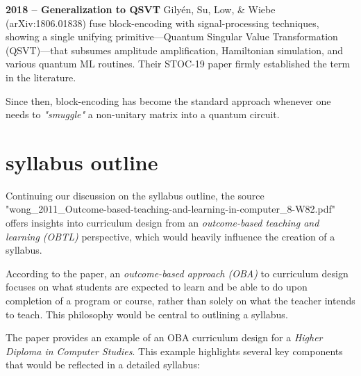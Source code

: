 \documentclass[11pt,a4paper]{article}
\begin{document}
	\textbf{2018 – Generalization to QSVT}  
	Gilyén, Su, Low, \& Wiebe (arXiv:1806.01838) fuse block-encoding with signal-processing techniques, showing a single unifying primitive—Quantum Singular Value Transformation (QSVT)—that subsumes amplitude amplification, Hamiltonian simulation, and various quantum ML routines. Their STOC-19 paper firmly established the term in the literature.
	
	Since then, block-encoding has become the standard approach whenever one needs to \textit{"smuggle"} a non-unitary matrix into a quantum circuit.
	

\section{syllabus outline}

	Continuing our discussion on the syllabus outline, the source \cite{Wong:2011} "wong\_2011\_Outcome-based-teaching-and-learning-in-computer\_8-W82.pdf" 
	offers insights into curriculum design from an \emph{outcome-based teaching and learning (OBTL)} perspective, 
	which would heavily influence the creation of a syllabus.
	
	According to the paper, an \emph{outcome-based approach (OBA)} to curriculum design focuses on what students are expected to learn and be able to do upon completion of a program or course, rather than solely on what the teacher intends to teach. This philosophy would be central to outlining a syllabus.
	
	The paper provides an example of an OBA curriculum design for a \emph{Higher Diploma in Computer Studies}. This example highlights several key components that would be reflected in a detailed syllabus:
	
\end{document}
